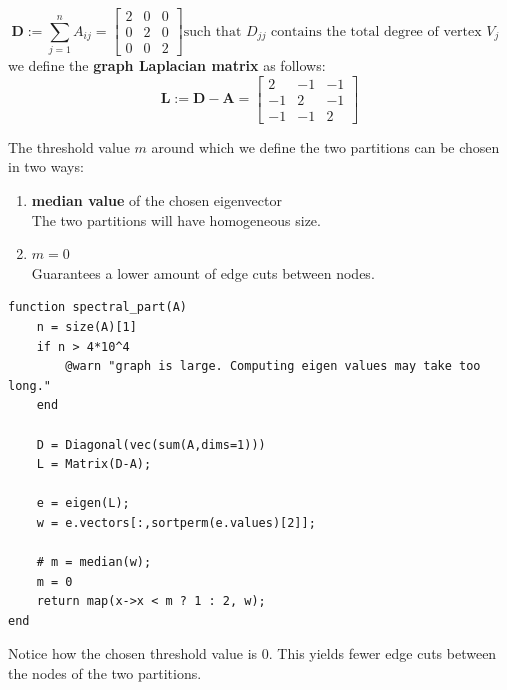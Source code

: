 \documentclass[unicode,11pt,a4paper,oneside,numbers=endperiod,openany]{scrartcl}
\begin{document}
\[
\mathbf{D}:=\sum_{j=1}^n A_{i j}=\left[\begin{array}{ccc}
2 & 0 & 0\\
0 & 2 & 0\\
0 & 0 & 2
\end{array}\right] \text{such that $D_{jj}$ contains the total degree of vertex $V_j$ }
\]
we define the \textbf{graph Laplacian matrix} as follows:
\[
\mathbf{L}:=\mathbf{D}-\mathbf{A}=\left[\begin{array}{ccc}
2 & -1 & -1\\
-1 & 2 & -1\\
-1 & -1 & 2
\end{array}\right]
\]

The threshold value $m$ around which we define the two partitions can be chosen in two ways:
\begin{enumerate}
\item \textbf{median value} of the chosen eigenvector\\
The two partitions will have homogeneous size.
\item \textbf{$m = 0$}\\
Guarantees a lower amount of edge cuts between nodes.
\end{enumerate}

\begin{verbatim}
function spectral_part(A)
    n = size(A)[1]
    if n > 4*10^4
        @warn "graph is large. Computing eigen values may take too long."     
    end

    D = Diagonal(vec(sum(A,dims=1)))
    L = Matrix(D-A);

    e = eigen(L);
    w = e.vectors[:,sortperm(e.values)[2]];

    # m = median(w);
    m = 0
    return map(x->x < m ? 1 : 2, w);
end
\end{verbatim}
Notice how the chosen threshold value is $0$. This yields fewer edge cuts between the nodes of the two partitions.
\end{document}
